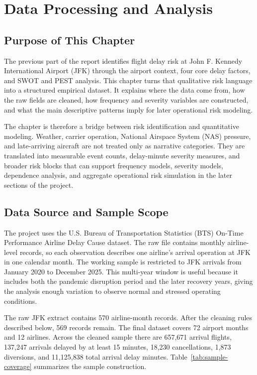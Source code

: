 \documentclass[11pt]{article}
\numberwithin{figure}{section}
\numberwithin{table}{section}
\begin{document}
\setcounter{section}{1}
\section{Data Processing and Analysis}

\subsection{Purpose of This Chapter}

The previous part of the report identifies flight delay risk at John F. Kennedy International Airport (JFK) through the airport context, four core delay factors, and SWOT and PEST analysis. This chapter turns that qualitative risk language into a structured empirical dataset. It explains where the data come from, how the raw fields are cleaned, how frequency and severity variables are constructed, and what the main descriptive patterns imply for later operational risk modeling.

The chapter is therefore a bridge between risk identification and quantitative modeling. Weather, carrier operation, National Airspace System (NAS) pressure, and late-arriving aircraft are not treated only as narrative categories. They are translated into measurable event counts, delay-minute severity measures, and broader risk blocks that can support frequency models, severity models, dependence analysis, and aggregate operational risk simulation in the later sections of the project.

\subsection{Data Source and Sample Scope}

The project uses the U.S. Bureau of Transportation Statistics (BTS) On-Time Performance Airline Delay Cause dataset. The raw file contains monthly airline-level records, so each observation describes one airline's arrival operation at JFK in one calendar month. The working sample is restricted to JFK arrivals from January 2020 to December 2025. This multi-year window is useful because it includes both the pandemic disruption period and the later recovery years, giving the analysis enough variation to observe normal and stressed operating conditions.

The raw JFK extract contains 570 airline-month records. After the cleaning rules described below, 569 records remain. The final dataset covers 72 airport months and 12 airlines. Across the cleaned sample there are 657,671 arrival flights, 137,247 arrivals delayed by at least 15 minutes, 18,230 cancellations, 1,873 diversions, and 11,125,838 total arrival delay minutes. Table~\ref{tab:sample-coverage} summarizes the sample construction.
\end{document}
